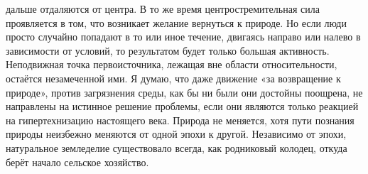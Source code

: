 \documentclass[a4paper]{book}
\begin{document}
дальше отдаляются от центра. В то же время центростремительная сила проявляется в том,
что возникает желание вернуться к природе. Но если люди просто случайно попадают в то
или иное течение, двигаясь направо или налево в зависимости от условий, то результатом
будет только большая активность. Неподвижная точка первоисточника, лежащая вне области
относительности, остаётся незамеченной ими. Я думаю, что даже движение «за возвращение
к природе», против загрязнения среды, как бы ни были они достойны поощрена, не
направлены на истинное решение проблемы, если они являются только реакцией на
гипертехнизацию настоящего века.
Природа не меняется, хотя пути познания природы неизбежно меняются от одной эпохи
к другой. Независимо от эпохи, натуральное земледелие существовало всегда, как
родниковый колодец, откуда берёт начало сельское хозяйство.
\end{document}
